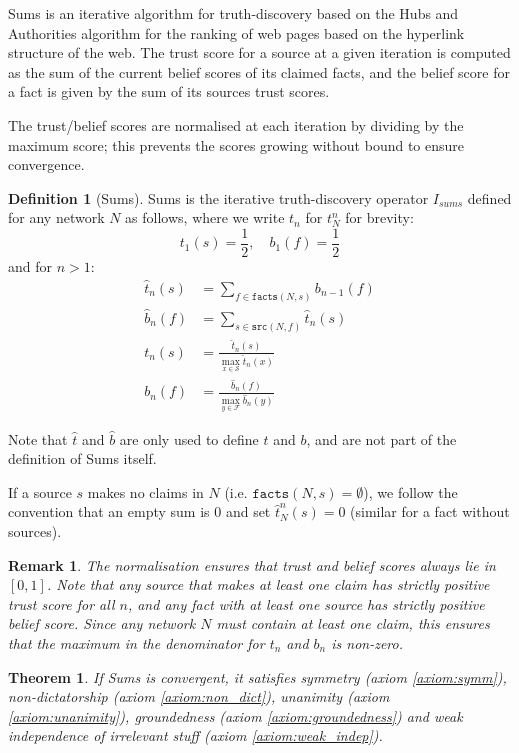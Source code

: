 \documentclass{article}
\theoremstyle{definition} \newtheorem{definition}{Definition}
\theoremstyle{definition} \newtheorem{example}{Example}
\theoremstyle{plain} \newtheorem{axiom}{Axiom}
\theoremstyle{plain} \newtheorem*{remark}{Remark}
\theoremstyle{remark} \newtheorem*{notation}{Notation}
\theoremstyle{plain} \newtheorem{lemma}{Lemma}
\theoremstyle{plain} \newtheorem{theorem}{Theorem}
\theoremstyle{plain} \newtheorem{proposition}{Proposition}
\renewcommand{\S}{\mathcal{S}}  %
\newcommand{\F}{\mathcal{F}}
\newcommand{\src}{\texttt{src}}
\newcommand{\fact}{\texttt{facts}}
\begin{document}
Sums\cite{pasternack} is an iterative algorithm for truth-discovery based on
the Hubs and Authorities \cite{kleinberg} algorithm for the ranking of web
pages based on the hyperlink structure of the web. The trust score for a source
at a given iteration is computed as the sum of the current belief scores of its
claimed facts, and the belief score for a fact is given by the sum of its
sources trust scores.

The trust/belief scores are normalised at each iteration by dividing by the
maximum score; this prevents the scores growing without bound to ensure
convergence.

\begin{definition}[Sums]
Sums is the iterative truth-discovery operator $I_{sums}$ defined for any
network $N$ as follows, where we write $t_n$ for $t_N^n$ for brevity:
\[
    t_1(s) = \frac{1}{2}, \quad b_1(f) = \frac{1}{2}
\]
and for $n > 1$:
\begin{align*}
    \hat{t}_n(s) & = \sum_{f \in \fact(N, s)}{b_{n - 1}(f)} \\
    \hat{b}_n(f) & = \sum_{s \in \src(N, f)}{\hat{t}_n(s)} \\
    t_n(s) & = \frac{\hat{t}_n(s)}{\max\limits_{x \in \S}{\hat{t}_n(x)}} \\
    b_n(f) & = \frac{\hat{b}_n(f)}{\max\limits_{y \in \F}{\hat{b}_n(y)}}
\end{align*}

Note that $\hat{t}$ and $\hat{b}$ are only used to define $t$ and $b$, and are
not part of the definition of Sums itself.

If a source $s$ makes no claims in $N$ (i.e. $\fact(N, s) = \emptyset$), we
follow the convention that an empty sum is 0 and set $\hat{t}_N^n(s)=0$
(similar for a fact without sources).
\end{definition}

\begin{remark}
The normalisation ensures that trust and belief scores always lie in $[0, 1]$.
Note that any source that makes at least one claim has strictly positive trust
score for all $n$, and any fact with at least one source has strictly positive
belief score. Since any network $N$ must contain at least one claim, this
ensures that the maximum in the denominator for $t_n$ and $b_n$ is non-zero.
\end{remark}

\begin{theorem}
\label{theorem:sums_axioms}
If Sums is convergent, it satisfies symmetry (axiom \ref{axiom:symm}),
non-dictatorship (axiom \ref{axiom:non_dict}), unanimity (axiom
\ref{axiom:unanimity}), groundedness (axiom \ref{axiom:groundedness}) and
weak independence of irrelevant stuff (axiom \ref{axiom:weak_indep}).
\end{theorem}
\end{document}
